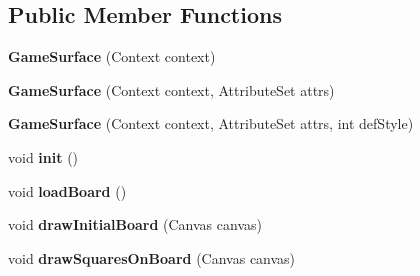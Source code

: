 \subsection*{Public Member Functions}
\begin{DoxyCompactItemize}
\item 
{\bfseries Game\+Surface} (Context context)\hypertarget{classcom_1_1initi_1_1thierry_1_1colormatchapp__v02_1_1_game_surface_a5d23dec0556d5643be6ed8987fb3b5f2}{}\label{classcom_1_1initi_1_1thierry_1_1colormatchapp__v02_1_1_game_surface_a5d23dec0556d5643be6ed8987fb3b5f2}

\item 
{\bfseries Game\+Surface} (Context context, Attribute\+Set attrs)\hypertarget{classcom_1_1initi_1_1thierry_1_1colormatchapp__v02_1_1_game_surface_ab623e19555a76b8987d7f6a0708e1beb}{}\label{classcom_1_1initi_1_1thierry_1_1colormatchapp__v02_1_1_game_surface_ab623e19555a76b8987d7f6a0708e1beb}

\item 
{\bfseries Game\+Surface} (Context context, Attribute\+Set attrs, int def\+Style)\hypertarget{classcom_1_1initi_1_1thierry_1_1colormatchapp__v02_1_1_game_surface_a1019bd552ba166d34f25edbdd734773b}{}\label{classcom_1_1initi_1_1thierry_1_1colormatchapp__v02_1_1_game_surface_a1019bd552ba166d34f25edbdd734773b}

\item 
void {\bfseries init} ()\hypertarget{classcom_1_1initi_1_1thierry_1_1colormatchapp__v02_1_1_game_surface_a025b97dcdf84e6e1b6ee5d52fddcffc8}{}\label{classcom_1_1initi_1_1thierry_1_1colormatchapp__v02_1_1_game_surface_a025b97dcdf84e6e1b6ee5d52fddcffc8}

\item 
void {\bfseries load\+Board} ()\hypertarget{classcom_1_1initi_1_1thierry_1_1colormatchapp__v02_1_1_game_surface_ab142beb808dfa72ad94d6cb246ee8d64}{}\label{classcom_1_1initi_1_1thierry_1_1colormatchapp__v02_1_1_game_surface_ab142beb808dfa72ad94d6cb246ee8d64}

\item 
void {\bfseries draw\+Initial\+Board} (Canvas canvas)\hypertarget{classcom_1_1initi_1_1thierry_1_1colormatchapp__v02_1_1_game_surface_ac26644b9b3cb7e35776b3a32831a9250}{}\label{classcom_1_1initi_1_1thierry_1_1colormatchapp__v02_1_1_game_surface_ac26644b9b3cb7e35776b3a32831a9250}

\item 
void {\bfseries draw\+Squares\+On\+Board} (Canvas canvas)\hypertarget{classcom_1_1initi_1_1thierry_1_1colormatchapp__v02_1_1_game_surface_a320fceaeaad6b0c84a7cad03365e0515}{}\label{classcom_1_1initi_1_1thierry_1_1colormatchapp__v02_1_1_game_surface_a320fceaeaad6b0c84a7cad03365e0515}


\end{DoxyCompactItemize}
